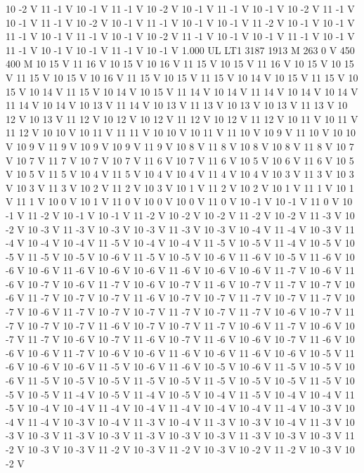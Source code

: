 {10 -2 V
11 -1 V
10 -1 V
11 -1 V
10 -2 V
10 -1 V
11 -1 V
10 -1 V
10 -2 V
11 -1 V
10 -1 V
11 -1 V
10 -2 V
10 -1 V
11 -1 V
10 -1 V
10 -1 V
11 -2 V
10 -1 V
10 -1 V
11 -1 V
10 -1 V
11 -1 V
10 -1 V
10 -2 V
11 -1 V
10 -1 V
10 -1 V
11 -1 V
10 -1 V
11 -1 V
10 -1 V
10 -1 V
11 -1 V
10 -1 V
1.000 UL
LT1
3187 1913 M
263 0 V
450 400 M
10 15 V
11 16 V
10 15 V
10 16 V
11 15 V
10 15 V
11 16 V
10 15 V
10 15 V
11 15 V
10 15 V
10 16 V
11 15 V
10 15 V
11 15 V
10 14 V
10 15 V
11 15 V
10 15 V
10 14 V
11 15 V
10 14 V
10 15 V
11 14 V
10 14 V
11 14 V
10 14 V
10 14 V
11 14 V
10 14 V
10 13 V
11 14 V
10 13 V
11 13 V
10 13 V
10 13 V
11 13 V
10 12 V
10 13 V
11 12 V
10 12 V
10 12 V
11 12 V
10 12 V
11 12 V
10 11 V
10 11 V
11 12 V
10 10 V
10 11 V
11 11 V
10 10 V
10 11 V
11 10 V
10 9 V
11 10 V
10 10 V
10 9 V
11 9 V
10 9 V
10 9 V
11 9 V
10 8 V
11 8 V
10 8 V
10 8 V
11 8 V
10 7 V
10 7 V
11 7 V
10 7 V
10 7 V
11 6 V
10 7 V
11 6 V
10 5 V
10 6 V
11 6 V
10 5 V
10 5 V
11 5 V
10 4 V
11 5 V
10 4 V
10 4 V
11 4 V
10 4 V
10 3 V
11 3 V
10 3 V
10 3 V
11 3 V
10 2 V
11 2 V
10 3 V
10 1 V
11 2 V
10 2 V
10 1 V
11 1 V
10 1 V
11 1 V
10 0 V
10 1 V
11 0 V
10 0 V
10 0 V
11 0 V
10 -1 V
10 -1 V
11 0 V
10 -1 V
11 -2 V
10 -1 V
10 -1 V
11 -2 V
10 -2 V
10 -2 V
11 -2 V
10 -2 V
11 -3 V
10 -2 V
10 -3 V
11 -3 V
10 -3 V
10 -3 V
11 -3 V
10 -3 V
10 -4 V
11 -4 V
10 -3 V
11 -4 V
10 -4 V
10 -4 V
11 -5 V
10 -4 V
10 -4 V
11 -5 V
10 -5 V
11 -4 V
10 -5 V
10 -5 V
11 -5 V
10 -5 V
10 -6 V
11 -5 V
10 -5 V
10 -6 V
11 -6 V
10 -5 V
11 -6 V
10 -6 V
10 -6 V
11 -6 V
10 -6 V
10 -6 V
11 -6 V
10 -6 V
10 -6 V
11 -7 V
10 -6 V
11 -6 V
10 -7 V
10 -6 V
11 -7 V
10 -6 V
10 -7 V
11 -6 V
10 -7 V
11 -7 V
10 -7 V
10 -6 V
11 -7 V
10 -7 V
10 -7 V
11 -6 V
10 -7 V
10 -7 V
11 -7 V
10 -7 V
11 -7 V
10 -7 V
10 -6 V
11 -7 V
10 -7 V
10 -7 V
11 -7 V
10 -7 V
11 -7 V
10 -6 V
10 -7 V
11 -7 V
10 -7 V
10 -7 V
11 -6 V
10 -7 V
10 -7 V
11 -7 V
10 -6 V
11 -7 V
10 -6 V
10 -7 V
11 -7 V
10 -6 V
10 -7 V
11 -6 V
10 -7 V
11 -6 V
10 -6 V
10 -7 V
11 -6 V
10 -6 V
10 -6 V
11 -7 V
10 -6 V
10 -6 V
11 -6 V
10 -6 V
11 -6 V
10 -6 V
10 -5 V
11 -6 V
10 -6 V
10 -6 V
11 -5 V
10 -6 V
11 -6 V
10 -5 V
10 -6 V
11 -5 V
10 -5 V
10 -6 V
11 -5 V
10 -5 V
10 -5 V
11 -5 V
10 -5 V
11 -5 V
10 -5 V
10 -5 V
11 -5 V
10 -5 V
10 -5 V
11 -4 V
10 -5 V
11 -4 V
10 -5 V
10 -4 V
11 -5 V
10 -4 V
10 -4 V
11 -5 V
10 -4 V
10 -4 V
11 -4 V
10 -4 V
11 -4 V
10 -4 V
10 -4 V
11 -4 V
10 -3 V
10 -4 V
11 -4 V
10 -3 V
10 -4 V
11 -3 V
10 -4 V
11 -3 V
10 -3 V
10 -4 V
11 -3 V
10 -3 V
10 -3 V
11 -3 V
10 -3 V
11 -3 V
10 -3 V
10 -3 V
11 -3 V
10 -3 V
10 -3 V
11 -2 V
10 -3 V
10 -3 V
11 -2 V
10 -3 V
11 -2 V
10 -3 V
10 -2 V
11 -2 V
10 -3 V
10 -2 V
}
